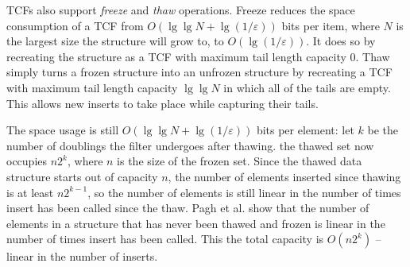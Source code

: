 \documentclass[sigconf, nonacm]{acmart}
\newcommand{\ints}{\mathbb{Z}}
\newcommand{\dotcup}{\ensuremath{\mathaccent\cdot\cup}}
\newcommand{\etal}{et al.}
\begin{document}
TCFs also support {\em freeze} and {\em thaw} operations.
Freeze reduces the space consumption of a TCF from $O(\lg \lg N + \lg (1/\varepsilon))$ bits per item, where $N$ is the largest size the structure will grow to, to $O(\lg (1/\varepsilon))$.
It does so by recreating the structure as a TCF with maximum tail length capacity $0$.
Thaw simply turns a frozen structure into an unfrozen structure by recreating a TCF with maximum tail length capacity $\lg \lg N$ in which all of the tails are empty.
This allows new inserts to take place while capturing their tails.

The space usage is still $O(\lg \lg N + \lg (1/\varepsilon))$ bits per element:
let $k$ be the number of doublings the filter undergoes after thawing.
the thawed set now occupies $n2^k$, where $n$ is the size of the frozen set.
Since the thawed data structure starts out of capacity $n$, the number of elements inserted since thawing is at least $n2^{k-1}$, so the number of elements is still linear in the number of times insert has been called since the thaw.
Pagh \etal{} show that the number of elements in a structure that has never been thawed and frozen is linear in the number of times insert has been called.
This the total capacity is $O(n2^k)$ -- linear in the number of inserts.






\end{document}
